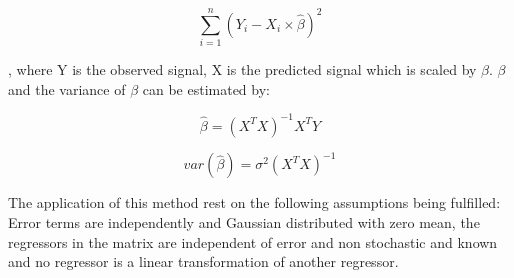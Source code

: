 \begin{equation}
\sum_{i=1}^{n}(Y_i-X_i\times\hat{\beta})^2
\end{equation}  

, where Y is the observed signal, X is the predicted signal which is scaled by $\beta$. $\beta$ and the variance of $\beta$ can be estimated by: 

\begin{equation}
\hat{\beta}=(X^TX)^{-1}X^TY
\end{equation}

\begin{equation}
var(\hat{\beta})=\sigma^2(X^TX)^{-1}
\end{equation}

The application of this method rest on the following assumptions being fulfilled: Error terms are independently and Gaussian distributed with zero mean, the regressors in the matrix are independent of error and non stochastic and known and no regressor is a linear transformation of another regressor. \cite{Monti2011}    




